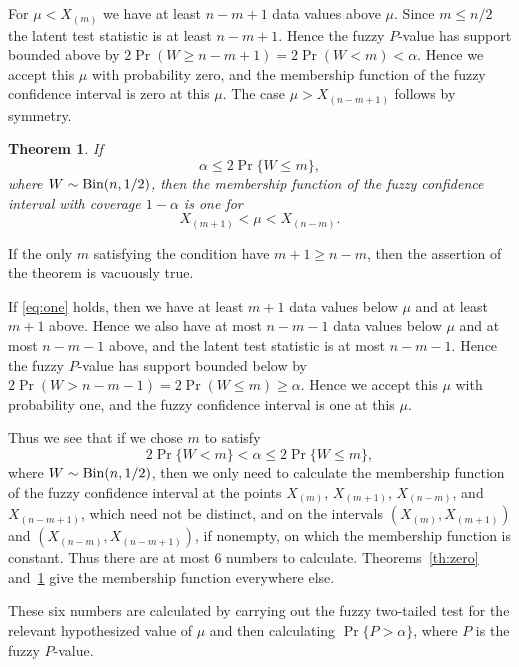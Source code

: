 \documentclass{article}
\newcommand{\BinomialDis}{\text{\upshape Bin}}
\newtheorem{theorem}{Theorem}
\begin{document}
For $\mu < X_{(m)}$
we have at least $n - m + 1$ data values above $\mu$.
Since $m \le n / 2$ the latent test
statistic is at least $n - m + 1$.
Hence the fuzzy $P$-value has support
bounded above by $2 \Pr(W \ge n - m + 1) = 2 \Pr(W < m) < \alpha$.
Hence we accept this $\mu$ with probability zero,
and the membership function of the fuzzy confidence interval is zero
at this $\mu$.
The case $\mu > X_{(n - m + 1)}$ follows by symmetry.

\begin{theorem} \label{th:one}
If
$$
   \alpha \le 2 \Pr \{ W \le m \},
$$
where $W \sim \BinomialDis(n, 1 / 2)$,
then the membership function of
the fuzzy confidence interval with coverage $1 - \alpha$ is one for
\begin{equation} \label{eq:one}
   X_{(m + 1)} < \mu < X_{(n - m)}.
\end{equation}
\end{theorem}
If the only $m$ satisfying the condition have $m + 1 \ge n - m$,
then the assertion of the theorem is vacuously true.

If \eqref{eq:one} holds, then
we have at least $m + 1$ data values below $\mu$ and at least $m + 1$ above.
Hence we also have at most $n - m - 1$ data values below $\mu$ and at most
$n - m - 1$ above, and the latent test statistic is at most $n - m - 1$.
Hence the fuzzy $P$-value has support
bounded below by $2 \Pr(W > n - m - 1) = 2 \Pr(W \le m) \ge \alpha$.
Hence we accept this $\mu$ with probability one,
and the fuzzy confidence interval is one at this $\mu$.

Thus we see that if we chose $m$ to satisfy
\begin{equation} \label{quantile}
   2 \Pr \{ W < m \} < \alpha \le 2 \Pr \{ W \le m \},
\end{equation}
where $W \sim \BinomialDis(n, 1 / 2)$, then we only need to calculate
the membership function of the fuzzy confidence interval at the points
$X_{(m)}$, $X_{(m + 1)}$, $X_{(n - m)}$, and $X_{(n - m + 1)}$,
which need not be distinct, and on the intervals
$(X_{(m)}, X_{(m + 1)})$ and $(X_{(n - m)}, X_{(n - m + 1)})$,
if nonempty, on which the membership function is constant.
Thus there are at most 6 numbers to calculate.  Theorems~\ref{th:zero}
and~\ref{th:one} give the membership function everywhere else.

These six numbers are calculated by carrying out the fuzzy two-tailed test
for the relevant hypothesized value of $\mu$ and then
calculating $\Pr \{ P > \alpha \}$, where $P$ is the fuzzy $P$-value.
\end{document}
